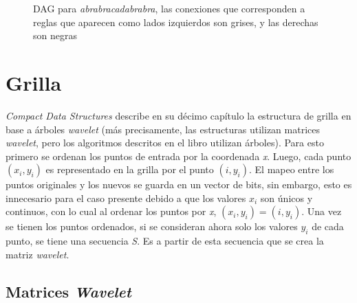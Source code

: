 \begin{figure}[H]
\caption{DAG para \textit{abrabracadabrabra}, las conexiones que corresponden a reglas que aparecen como lados izquierdos son grises, y las derechas son negras}
\label{fig:DAG}
\end{figure}


\newpage
\section{Grilla}

\textit{Compact Data Structures}\cite{Navarro} describe en su décimo capítulo la estructura de grilla en base a árboles \textit{wavelet} (más precisamente, las estructuras utilizan matrices \textit{wavelet}, pero los algoritmos descritos en el libro utilizan árboles). Para esto primero se ordenan los puntos de entrada por la coordenada \textit{x}. Luego, cada punto $(x_i, y_i)$ es representado en la grilla por el punto $(i, y_i)$. El mapeo entre los puntos originales y los nuevos se guarda en un vector de bits, sin embargo, esto es innecesario para el caso presente debido a que los valores $x_i$ son únicos y continuos, con lo cual al ordenar los puntos por \textit{x}, $(x_i, y_i) = (i, y_i)$. Una vez se tienen los puntos ordenados, si se consideran ahora solo los valores $y_i$ de cada punto, se tiene una secuencia \textit{S}. Es a partir de esta secuencia que se crea la matriz \textit{wavelet}\cite[Capítulo 6.2.5]{Navarro}.

\subsection{Matrices \textit{Wavelet}}

